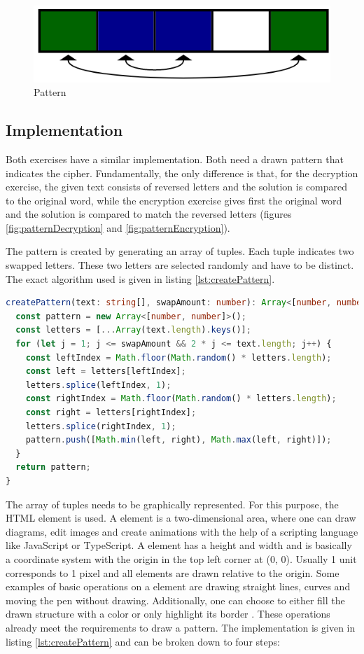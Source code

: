 \begin{figure} 
    \centering
    \includegraphics[width=0.4 \columnwidth]{figures/pattern.png}
    \caption{Pattern} 
    \label{fig:pattern} 
\end{figure}

\subsection{Implementation}

Both exercises have a similar implementation. Both need a drawn pattern that indicates the cipher. Fundamentally, the only difference is that, for the decryption exercise, the given text consists of reversed letters and the solution is compared to the original word, while the encryption exercise gives first the original word and the solution is compared to match the reversed letters (figures \ref{fig:patternDecryption} and \ref{fig:patternEncryption}). 

The pattern is created by generating an array of tuples. Each tuple indicates two swapped letters. These two letters are selected randomly and have to be distinct. The exact algorithm used is given in listing \ref{lst:createPattern}.

\begin{lstlisting}[language=TypeScript,caption={Algorithm to generate an array of distinct tuples of given size},label={lst:createPattern}]
createPattern(text: string[], swapAmount: number): Array<[number, number]> {
  const pattern = new Array<[number, number]>();
  const letters = [...Array(text.length).keys()];
  for (let j = 1; j <= swapAmount && 2 * j <= text.length; j++) {
    const leftIndex = Math.floor(Math.random() * letters.length);
    const left = letters[leftIndex];
    letters.splice(leftIndex, 1);
    const rightIndex = Math.floor(Math.random() * letters.length);
    const right = letters[rightIndex];
    letters.splice(rightIndex, 1);
    pattern.push([Math.min(left, right), Math.max(left, right)]);
  }
  return pattern;
}
\end{lstlisting}

The array of tuples needs to be graphically represented. For this purpose, the HTML  element is used. A  element is a two-dimensional area, where one can draw diagrams, edit images and create animations with the help of a scripting language like JavaScript or TypeScript. A  element has a height and width and is basically a coordinate system with the origin in the top left corner at (0, 0). Usually 1 unit corresponds to 1 pixel and all elements are drawn relative to the origin. Some examples of basic operations on a  element are drawing straight lines, curves and moving the pen without drawing. Additionally, one can choose to either fill the drawn structure with a color or only highlight its border \cite{MDNWebDocs}. These operations already meet the requirements to draw a pattern. The implementation is given in  listing \ref{lst:createPattern} and can be broken down to four steps: 

